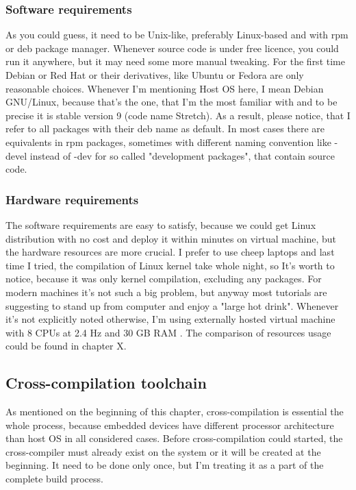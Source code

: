 \documentclass[printmode]{mgr}
\begin{document}
\subsubsection{Software requirements}
As you could guess, it need to be Unix-like, preferably Linux-based and with rpm or deb package manager. Whenever source code is under free licence, you could run it anywhere, but it may need some more manual tweaking. For the first time Debian or Red Hat or their derivatives, like Ubuntu or Fedora are only reasonable choices. Whenever I'm mentioning Host OS here, I mean Debian GNU/Linux, because that's the one, that I'm the most familiar with and to be precise it is stable version 9 (code name Stretch). As a result, please notice, that I refer to all packages with their deb name as default. In most cases there are equivalents in rpm packages, sometimes with different naming convention like -devel instead of -dev for so called "development packages", that contain source code. \\

\subsubsection{Hardware requirements}
The software requirements are easy to satisfy, because we could get Linux distribution with no cost and deploy it within minutes on virtual machine, but the hardware resources are more crucial. I prefer to use cheep laptops and last time I tried, the compilation of Linux kernel take whole night, so It's worth to notice, because it was only kernel compilation, excluding any packages. For modern machines it's not such a big problem, but anyway most tutorials are suggesting to stand up from computer and enjoy a "large hot drink". Whenever it's not explicitly noted otherwise, I'm using externally hosted virtual machine with 8 CPUs at 2.4 Hz and 30 GB RAM . The comparison of resources usage could be found in chapter X. %

\subsection{Cross-compilation toolchain}

As mentioned on the beginning of this chapter, cross-compilation is essential the whole process, because embedded devices have different processor architecture than host OS in all considered cases. Before cross-compilation could started, the cross-compiler must already exist on the system or it will be created at the beginning. It need to be done only once, but I'm treating it as a part of the complete build process. \\
\end{document}
